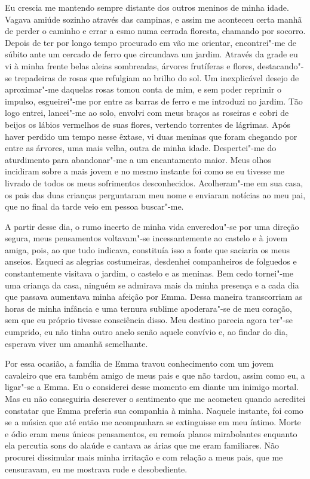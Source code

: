 Eu crescia me mantendo sempre distante dos outros meninos de minha
idade. Vagava amiúde sozinho através das campinas, e
assim me aconteceu certa manhã de perder o caminho e errar a esmo numa
cerrada floresta, chamando por socorro. Depois de ter por longo tempo
procurado em vão me orientar, encontrei"-me de súbito ante um cercado de
ferro que circundava um jardim. Através da grade eu vi à minha frente
belas aleias sombreadas, árvores frutíferas e flores, destacando"-se
trepadeiras de rosas que refulgiam ao brilho do sol. Um inexplicável
desejo de aproximar"-me daquelas rosas tomou conta de mim, e sem poder
reprimir o impulso, esgueirei"-me por entre as barras de ferro e me
introduzi no jardim. Tão logo entrei, lancei"-me ao solo, envolvi com
meus braços as roseiras e cobri de beijos os lábios vermelhos de
suas flores, vertendo torrentes de lágrimas. Após haver perdido um
tempo nesse êxtase, vi duas meninas que foram chegando por entre as
árvores, uma mais velha, outra de minha idade. Despertei"-me do
aturdimento para abandonar"-me a um encantamento maior. Meus olhos
incidiram sobre a mais jovem e no mesmo instante foi como se eu tivesse
me livrado de todos os meus sofrimentos desconhecidos. Acolheram"-me em sua
casa, os pais das duas crianças perguntaram meu nome e enviaram
notícias ao meu pai, que no final da tarde veio em pessoa buscar"-me.

A partir desse dia, o rumo incerto de minha vida enveredou"-se por uma
direção segura, meus pensamentos voltavam"-se incessantemente ao castelo e
à jovem amiga, pois, ao que tudo indicava, constituía isso a fonte que
saciaria os meus anseios. Esqueci as alegrias costumeiras, desdenhei
companheiros de folguedos e constantemente visitava o jardim, o
castelo e as meninas. Bem cedo tornei"-me uma criança da casa, ninguém
se admirava mais da minha presença e a cada dia que passava aumentava
minha afeição por Emma. Dessa maneira transcorriam as horas de minha
infância e uma ternura sublime apoderara"-se de meu coração, sem que eu
próprio tivesse consciência disso. Meu destino parecia agora ter"-se
cumprido, eu não tinha outro anelo senão aquele convívio e, ao findar 
do dia, esperava viver um amanhã semelhante.

Por essa ocasião, a família de Emma travou conhecimento com um jovem
cavaleiro que era também amigo de meus pais e que não tardou, assim
como eu, a ligar"-se a Emma. Eu o considerei desse momento em diante um
inimigo mortal. Mas eu não \mbox{conseguiria} \mbox{descrever} o sentimento que me
acometeu quando acreditei constatar que Emma preferia sua companhia à
minha. Naquele instante, foi como se a música que até então me
acompanhara se extinguisse em meu íntimo. Morte e ódio eram meus únicos
pensamentos, eu remoía planos mirabolantes enquanto ela percutia sons
do alaúde e cantava as árias que me eram familiares. Não procurei
dissimular mais minha irritação e com relação a meus pais, que me
censuravam, eu me mostrava rude e desobediente.

